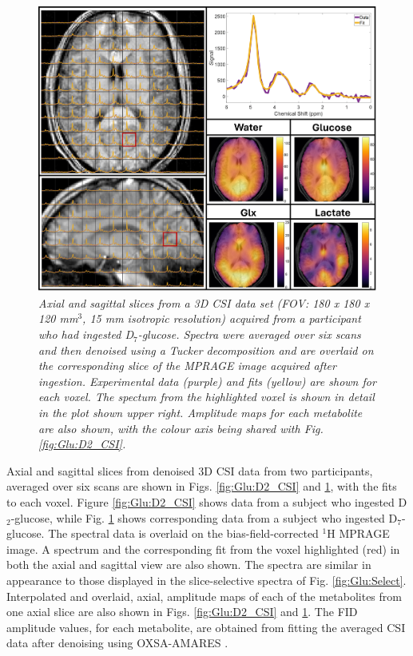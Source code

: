 \begin{figure}
    \centering
    \includegraphics[width = 1\textwidth]{Figures/Glucose/D7_CSI.png}
    \caption{\textit{Axial and sagittal slices from a 3D \ac{CSI} data set (\ac{FOV}: 180 {\normalfont x} 180 {\normalfont x} 120 mm$^3$, 15 mm isotropic resolution) acquired from a participant who had ingested D$_7$-glucose. Spectra were averaged over six scans and then denoised using a Tucker decomposition and are overlaid on the corresponding slice of the \ac{MPRAGE} image acquired after ingestion. Experimental data (purple) and fits (yellow) are shown for each voxel. The spectum from the highlighted voxel is shown in detail in the plot shown upper right. Amplitude maps for each metabolite are also shown, with the colour axis being shared with Fig. \ref{fig:Glu:D2_CSI}.}}
    \label{fig:Glu:D7_CSI}
\end{figure}

Axial and sagittal slices from denoised 3D \ac{CSI} data from two participants, averaged over six scans are shown in Figs. \ref{fig:Glu:D2_CSI} and \ref{fig:Glu:D7_CSI}, with the fits to each voxel. Figure \ref{fig:Glu:D2_CSI} shows data from a subject who ingested D$_2$-glucose, while Fig. \ref{fig:Glu:D7_CSI} shows corresponding data from a subject who ingested D$_7$-glucose. The spectral data is overlaid on the bias-field-corrected $^1$H \ac{MPRAGE} image. A spectrum and the corresponding fit from the voxel highlighted (red) in both the axial and sagittal view are also shown. The spectra are similar in appearance to those displayed in the slice-selective spectra of Fig. \ref{fig:Glu:Select}. Interpolated and overlaid, axial, amplitude maps of each of the metabolites from one axial slice are also shown in Figs. \ref{fig:Glu:D2_CSI} and \ref{fig:Glu:D7_CSI}. The \ac{FID} amplitude values, for each metabolite, are obtained from fitting the averaged \ac{CSI} data after denoising using OXSA-AMARES \cite{Vanhamme1997ImprovedKnowledge, Purvis2017OXSA:MATLAB}.

